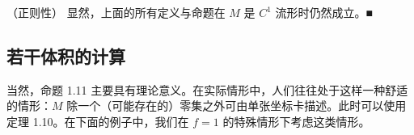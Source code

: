 \begin{remark}

（正则性） 显然，上面的所有定义与命题在 $ M $ 是 $ C^1 $ 流形时仍然成立。\nobreak\hspace{0.35em}■

\end{remark}

\subsection*{若干体积的计算}

当然，命题 1.11 主要具有理论意义。在实际情形中，人们往往处于这样一种舒适的情形：$ M $ 除一个（可能存在的）零集之外可由单张坐标卡描述。此时可以使用定理 1.10。在下面的例子中，我们在 $ f = 1 $ 的特殊情形下考虑这类情形。

